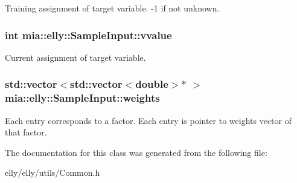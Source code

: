 Training assignment of target variable. -\/1 if not unknown. \hypertarget{classmia_1_1elly_1_1_sample_input_a89286408bf1f1ff6fa60b0427f246653}{
\subsubsection[{vvalue}]{\setlength{\rightskip}{0pt plus 5cm}int mia\-::elly\-::\-Sample\-Input\-::vvalue}}\label{classmia_1_1elly_1_1_sample_input_a89286408bf1f1ff6fa60b0427f246653}
Current assignment of target variable. \hypertarget{classmia_1_1elly_1_1_sample_input_a34c24a75257fa27d5d728719afcdde43}{
\subsubsection[{weights}]{\setlength{\rightskip}{0pt plus 5cm}std\-::vector$<$std\-::vector$<$double$>$$\ast$ $>$ mia\-::elly\-::\-Sample\-Input\-::weights}}\label{classmia_1_1elly_1_1_sample_input_a34c24a75257fa27d5d728719afcdde43}
Each entry corresponds to a factor. Each entry is pointer to weights vector of that factor. 

The documentation for this class was generated from the following file\-:\begin{DoxyCompactItemize}
\item 
elly/elly/utils/Common.\-h\end{DoxyCompactItemize}

